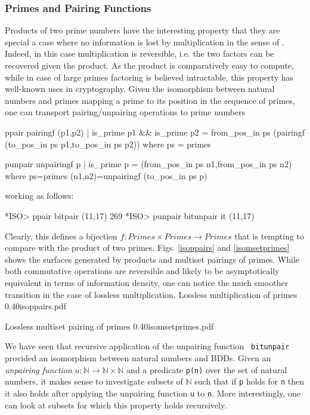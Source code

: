 \documentclass[]{INCLUDES/llncs}
\begin{document}
\subsubsection{Primes and Pairing Functions}
Products of two prime numbers have the interesting property that they are
special a case where no information is lost by multiplication in the sense of
\cite{DBLP:journals/tit/Pippenger05}. Indeed, in this case multiplication is
reversible, i.e. the two factors can be recovered given the product. 
As the product is comparatively easy to compute, while in case of large primes
factoring is believed intractable, this property has well-known uses in
cryptography.
Given the isomorphism between natural numbers and primes mapping a prime to its
position in the sequence of primes, one can transport pairing/unpairing
operations to prime numbers
\begin{code}
ppair pairingf (p1,p2) | is_prime p1 && is_prime p2 = 
  from_pos_in ps (pairingf (to_pos_in ps p1,to_pos_in ps p2)) where 
    ps = primes
 
punpair unpairingf p | is_prime p = (from_pos_in ps n1,from_pos_in ps n2) where 
  ps=primes
  (n1,n2)=unpairingf (to_pos_in ps p)
\end{code}
working as follows:
\begin{codex}
*ISO> ppair bitpair (11,17)
269
*ISO> punpair bitunpair it
(11,17)
\end{codex}
Clearly, this defines a bijection $f : Primes \times Primes \rightarrow Primes$
that is tempting to compare with the product of two primes. 
Figs. \ref{isoppairs} and \ref{isomsetprimes} shows the surfaces
generated by products and multiset pairings of primes. While both commutative
operations are reversible and likely to be asymptotically equivalent in
terms of information density, one can notice the much smoother transition in the case
of lossless multiplication.
{Lossless multiplication of primes}
{0.40}{isoppairs.pdf}

{Lossless multiset pairing of primes}
{0.40}{isomsetprimes.pdf}

We have seen that recursive application of the unpairing function {\tt
bitunpair} provided an isomorphism between natural numbers and BDDs. 
Given an {\em unpairing function} {$u:\mathbb{N} \rightarrow \mathbb{N} \times \mathbb{N}$} and a
predicate {\tt p(n)} over the set of natural numbers, it makes sense to
investigate subsets of $\mathbb{N}$ such that if {\tt p} holds for {\tt n} then it also
holds after applying the unpairing function {\tt u} to {\tt n}. More
interestingly, one can look at subsets for which this property holds recursively.
\end{document}
